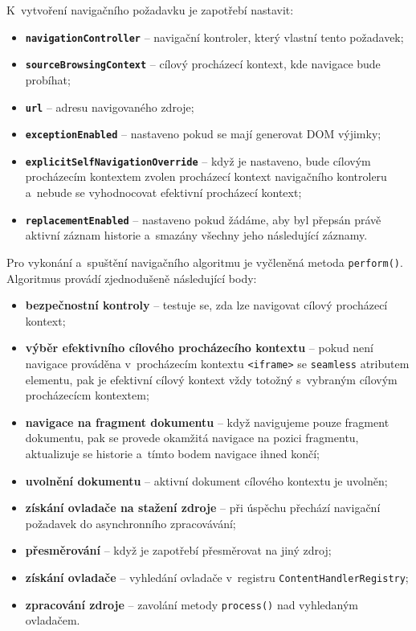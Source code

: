 \bigskip \noindent K~vytvoření navigačního požadavku je zapotřebí nastavit:  

\begin{itemize}
  \item \textbf{\texttt{navigationController}} -- navigační kontroler, který vlastní tento požadavek;
  \item \textbf{\texttt{sourceBrowsingContext}} -- cílový procházecí kontext, kde navigace bude probíhat;
  \item \textbf{\texttt{url}} -- adresu navigovaného zdroje;
  \item \textbf{\texttt{exceptionEnabled}} -- nastaveno pokud se mají generovat DOM výjimky;
  \item \textbf{\texttt{explicitSelfNavigationOverride}} -- když je nastaveno, bude cílovým procházecím kontextem zvolen procházecí kontext navigačního kontroleru a~nebude se vyhodnocovat efektivní procházecí kontext;
  \item \textbf{\texttt{replacementEnabled}} -- nastaveno pokud žádáme, aby byl přepsán právě aktivní záznam historie a~smazány všechny jeho následující záznamy.
\end{itemize}

Pro vykonání a~spuštění navigačního algoritmu je vyčleněná metoda \texttt{perform()}. Algoritmus provádí zjednodušeně následující body:

\begin{itemize}
  \item \textbf{bezpečnostní kontroly} -- testuje se, zda lze navigovat cílový procházecí kontext;
  \item \textbf{výběr efektivního cílového procházecího kontextu} -- pokud není navigace prováděna v~procházecím kontextu \texttt{<iframe>} se \texttt{seamless} atributem elementu, pak je efektivní cílový kontext vždy totožný s~vybraným cílovým procházecícm kontextem;
  \item \textbf{navigace na fragment dokumentu} -- když navigujeme pouze fragment dokumentu, pak se provede okamžitá navigace na pozici fragmentu, aktualizuje se historie a~tímto bodem navigace ihned končí; 
  \item \textbf{uvolnění dokumentu} -- aktivní dokument cílového kontextu je uvolněn;
  \item \textbf{získání ovladače na stažení zdroje} -- při úspěchu přechází navigační požadavek do asynchronního zpracovávání;
  \item \textbf{přesměrování} -- když je zapotřebí přesměrovat na jiný zdroj;
  \item \textbf{získání ovladače} -- vyhledání ovladače v~registru \texttt{ContentHandlerRegistry}; 
  \item \textbf{zpracování zdroje} -- zavolání metody \texttt{process()} nad vyhledaným ovladačem.
\end{itemize}

